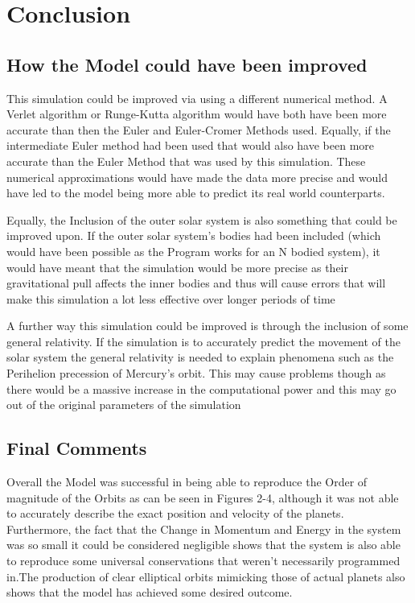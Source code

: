 \documentclass[a4paper,10pt]{article}
\begin{document}
\newpage

\section{Conclusion}
\subsection{How the Model could have been improved}
This simulation could be improved via using a different numerical method. A Verlet algorithm or Runge-Kutta algorithm would have both have been more accurate than then the Euler and Euler-Cromer Methods used. Equally, if the intermediate Euler method had been used that would also have been more accurate than the Euler Method that was used by this simulation. These numerical approximations would have made the data more precise and would have led to the model being more able to predict its real world counterparts.

Equally, the Inclusion of the outer solar system is also something that could be improved upon. If the outer solar system's bodies had been included (which would have been possible as the Program works for an N bodied system), it would have meant that the simulation would be more precise as their gravitational pull affects the inner bodies and thus will cause errors that will make this simulation a lot less effective over longer periods of time

A further way this simulation could be improved is through the inclusion of some general relativity. If the simulation is to accurately predict the movement of the solar system the general relativity is needed to explain phenomena such as the Perihelion precession of Mercury's orbit. This may cause problems though as there would be a massive increase in the computational power and this may go out of the original parameters of the simulation

\subsection{Final Comments}
Overall the Model was successful in being able to reproduce the Order of magnitude of the Orbits as can be seen in Figures 2-4, although it was not able to accurately describe the exact position and velocity of the planets. Furthermore, the fact that the Change in Momentum and Energy in the system was so small it could be considered negligible shows that the system is also able to reproduce some universal conservations that weren't necessarily programmed in.The production of clear elliptical orbits mimicking those of actual planets also shows that the model has achieved some desired outcome.
\end{document}
